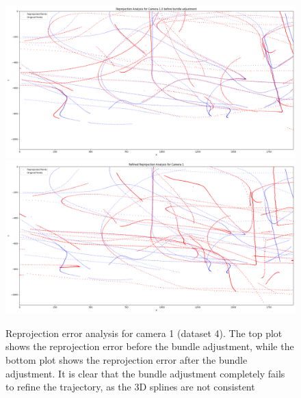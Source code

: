 \documentclass[11pt]{article}
\begin{document}
\begin{figure}[h]
    \centering
    \includegraphics[width=\textwidth]{../plots/dataset4/reprojection_analysis_camera_1_before_ba_.png}
    \includegraphics[width=\textwidth]{../plots/dataset4/reprojection_analysis_camera_1.png}
    \caption{Reprojection error analysis for camera 1 (dataset 4). The top plot shows the reprojection error before the bundle adjustment, while the bottom plot shows the reprojection error after the bundle adjustment. It is clear that the bundle adjustment completely fails to refine the trajectory, as the 3D splines are not consistent}
    \label{fig:bad_ba}
\end{figure}


\end{document}
